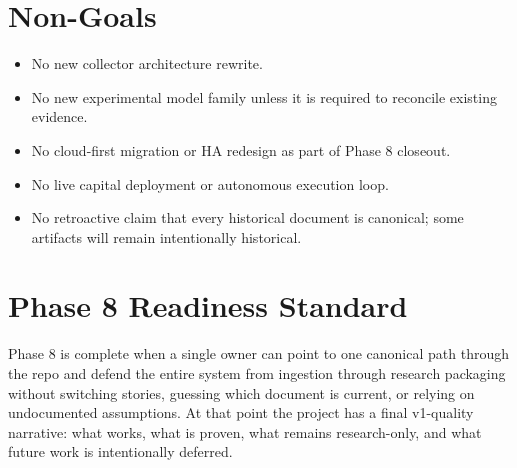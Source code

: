 \documentclass{article}
\begin{document}
\section*{Non-Goals}
\begin{itemize}
\item No new collector architecture rewrite.
\item No new experimental model family unless it is required to reconcile existing evidence.
\item No cloud-first migration or HA redesign as part of Phase 8 closeout.
\item No live capital deployment or autonomous execution loop.
\item No retroactive claim that every historical document is canonical; some artifacts will remain intentionally historical.
\end{itemize}

\section*{Phase 8 Readiness Standard}
Phase 8 is complete when a single owner can point to one canonical path through the repo and defend the entire system from ingestion through research packaging without switching stories, guessing which document is current, or relying on undocumented assumptions. At that point the project has a final v1-quality narrative: what works, what is proven, what remains research-only, and what future work is intentionally deferred.
\end{document}
